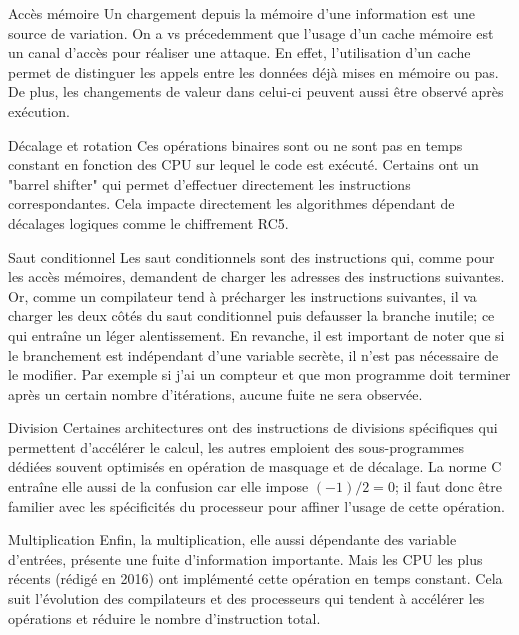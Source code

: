 \begin{CitationBox}{Accès mémoire}
  Un chargement depuis la mémoire d'une information est une source de variation. On a vs précedemment \cite{LLC_attack,DRAM_Attack} que l'usage d'un cache mémoire est un canal d'accès pour réaliser une attaque. En effet, l'utilisation d'un cache permet de distinguer les appels entre les données déjà mises en mémoire ou pas. De plus, les changements de valeur dans celui-ci peuvent aussi être observé après exécution.
\end{CitationBox}
\vspace{0.1cm}
\begin{CitationBox}{Décalage et rotation}
  Ces opérations binaires sont ou ne sont pas en temps constant en fonction des CPU sur lequel le code est exécuté. Certains ont un "barrel shifter" qui permet d'effectuer directement les instructions correspondantes. Cela impacte directement les algorithmes dépendant de décalages logiques comme le chiffrement RC5.
\end{CitationBox}
\vspace{0.1cm}
\begin{CitationBox}{Saut conditionnel}
  Les saut conditionnels sont des instructions qui, comme pour les accès mémoires, demandent de charger les adresses des instructions suivantes. Or, comme un compilateur tend à précharger les instructions suivantes, il va charger les deux côtés du saut conditionnel puis defausser la branche inutile; ce qui entraîne un léger alentissement. En revanche, il est important de noter que si le branchement est indépendant d'une variable secrète, il n'est pas nécessaire de le modifier. Par exemple si j'ai un compteur et que mon programme doit terminer après un certain nombre d'itérations, aucune fuite ne sera observée.
\end{CitationBox}
\vspace{0.1cm}
\begin{CitationBox}{Division}
  Certaines architectures ont des instructions de divisions spécifiques qui permettent d'accélérer le calcul, les autres emploient des sous-programmes dédiées souvent optimisés en opération de masquage et de décalage. La norme C entraîne elle aussi de la confusion car elle impose $(-1)/2 = 0$; il faut donc être familier avec les spécificités du processeur pour affiner l'usage de cette opération.
\end{CitationBox}
\vspace{0.1cm}
\begin{CitationBox}{Multiplication}
  Enfin, la multiplication, elle aussi dépendante des variable d'entrées, présente une fuite d'information importante. Mais les CPU les plus récents (rédigé en 2016) ont implémenté cette opération en temps constant. Cela suit l'évolution des compilateurs et des processeurs qui tendent à accélérer les opérations et réduire le nombre d'instruction total.
\end{CitationBox}
\vspace{0.1cm}

